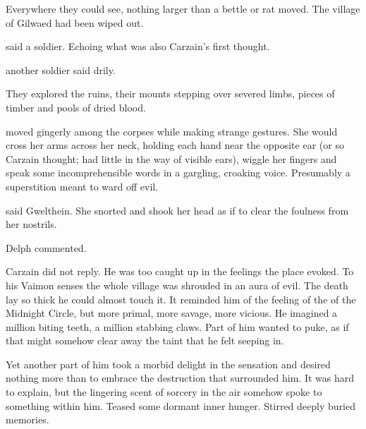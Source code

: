 Everywhere they could see, nothing larger than a bettle or rat moved. 
The village of Gilwaed had been wiped out. 

 said a soldier. 
Echoing what was also Carzain's first thought. 

 another soldier said drily. 

They explored the ruins, their mounts stepping over severed limbs, pieces of timber and pools of dried blood. 

\Tsekkect{} moved gingerly among the corpses while making strange gestures. 
She would cross her arms across her neck, holding each hand near the opposite ear (or so Carzain thought; \meccara{} had little in the way of visible ears), wiggle her fingers and speak some incomprehensible words in a gargling, croaking voice. 
Presumably a superstition meant to ward off evil. 

 said Gwelthein. 
She snorted and shook her head as if to clear the foulness from her nostrils. 

 Delph commented. 

Carzain did not reply. 
He was too caught up in the feelings the place evoked. 
To his Vaimon senses the whole village was shrouded in an aura of evil. 
The death lay so thick he could almost touch it. 
It reminded him of the feeling of the \qliphoth{} of the Midnight Circle, but more primal, more savage, more vicious. 
He imagined a million biting teeth, a million stabbing claws. 
Part of him wanted to puke, as if that might somehow clear away the taint that he felt seeping in. 

Yet another part of him took a morbid delight in the sensation and desired nothing more than to embrace the destruction that surrounded him. 
It was hard to explain, but the lingering scent of sorcery in the air somehow spoke to something within him. 
Teased some dormant inner hunger. 
Stirred deeply buried memories. 

